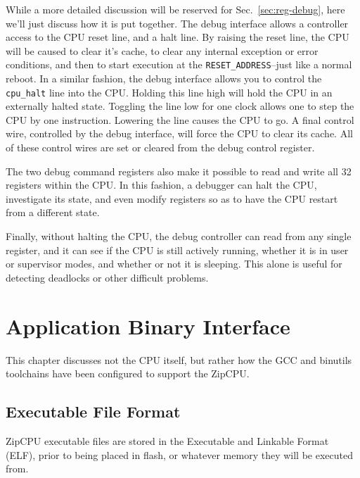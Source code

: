 \documentclass{gqtekspec}
\begin{document}
While a more detailed discussion will be reserved for Sec.~\ref{sec:reg-debug},
here we'll just discuss how it is put together.  The debug interface allows
a controller access to the CPU reset line, and a halt line.  By raising the
reset line, the CPU will be caused to clear it's cache, to clear any internal
exception or error conditions, and then to start execution at the
{\tt RESET\_ADDRESS}--just like a normal reboot.  In a similar fashion, the
debug interface allows you to control the {\tt cpu\_halt} line into the
CPU.  Holding this line high will hold the CPU in an externally halted state.
Toggling the line low for one clock allows one to step the CPU by one 
instruction.  Lowering the line causes the CPU to go.  A final control wire, 
controlled by the debug interface, will force the CPU to clear its cache.
All of these control wires are set or cleared from the debug control register.

The two debug command registers also make it possible to read and write
all 32 registers within the CPU.  In this fashion, a debugger can halt the
CPU, investigate its state, and even modify registers so as to have the
CPU restart from a different state.

Finally, without halting the CPU, the debug controller can read from any
single register, and it can see if the CPU is still actively running, whether
it is in user or supervisor modes, and whether or not it is sleeping.  This
alone is useful for detecting deadlocks or other difficult problems.

\chapter{Application Binary Interface}\label{chap:abi}

This chapter discusses not the CPU itself, but rather how the GCC and binutils
toolchains have been configured to support the ZipCPU.


\section{Executable File Format}\label{sec:abi-elf}
ZipCPU executable files are stored in the Executable and Linkable Format
(ELF), prior to being placed in flash, or whatever memory they will be
executed from.  
\end{document}
